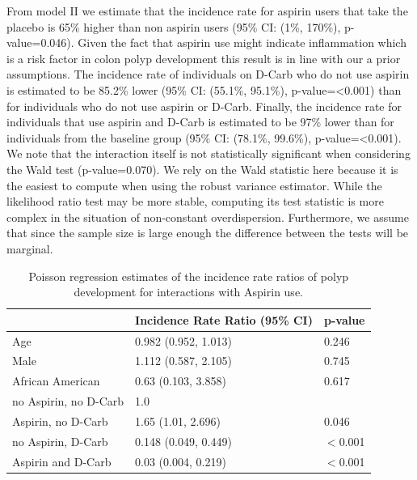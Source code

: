 \documentclass[paper=a4, fontsize=11pt]{scrartcl} %
\numberwithin{equation}{section} %
\numberwithin{figure}{section} %
\numberwithin{table}{section} %
\begin{document}
From model II we estimate that the incidence rate for aspirin users that take the placebo is 65\% higher than non aspirin users (95\% CI: (1\%, 170\%), p-value=0.046). Given the fact that aspirin use might indicate inflammation which is a risk factor in colon polyp development this result is in line with our a prior assumptions. The incidence rate of individuals on D-Carb who do not use aspirin is estimated to be 85.2\% lower (95\% CI: (55.1\%, 95.1\%), p-value=<0.001) than for individuals who do not use aspirin or D-Carb. Finally, the incidence rate for individuals that use aspirin and D-Carb is estimated to be 97\% lower than for individuals from the baseline group (95\% CI: (78.1\%, 99.6\%), p-value=<0.001). We note that the interaction itself is not statistically significant when considering the Wald test (p-value=0.070). %
We rely on the Wald statistic here because it is the easiest to compute when using the robust variance estimator. While the likelihood ratio test may be more stable, computing its test statistic is more complex in the situation of non-constant overdispersion. Furthermore, we assume that since the sample size is large enough the difference between the tests will be marginal.\\

\captionsetup{width=.5\textwidth}
\begin{table}
\centering
\caption{Poisson regression estimates of the incidence rate ratios of polyp development for interactions with Aspirin use.}
\label{tab:model_ii_results}
\begin{tabular}{m{4cm} m{3.5cm} l}
  \hline
 & Incidence Rate Ratio (95\% CI) & p-value \\ 
  \hline
  Age & 0.982 (0.952, 1.013) & 0.246 \\ 
  Male & 1.112 (0.587, 2.105) & 0.745 \\ 
  African American & 0.63 (0.103, 3.858) & 0.617 \\ 
  no Aspirin, no D-Carb & 1.0 & \\ 
  Aspirin, no D-Carb & 1.65 (1.01, 2.696) & 0.046 \\ 
  no Aspirin, D-Carb & 0.148 (0.049, 0.449) & $<$0.001 \\ 
  Aspirin and D-Carb & 0.03 (0.004, 0.219) & $<$0.001 \\ 
   \hline
\end{tabular}
\end{table}
\end{document}
